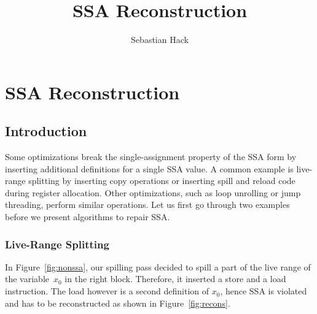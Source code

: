 





\title{SSA Reconstruction}
\author{Sebastian Hack}

\chapter{SSA Reconstruction }

\section{Introduction}

Some optimizations break the single-assignment property of the SSA form by inserting additional definitions for a single SSA value.
A common example is live-range splitting by inserting copy operations or inserting spill and reload code during register allocation.
Other optimizations, such as loop unrolling or jump threading, perform similar operations.
Let us first go through two examples before we present algorithms to repair SSA.

\subsection{Live-Range Splitting}

In Figure~\ref{fig:nonssa}, our spilling pass decided to spill a part of the live range of the variable~$x_0$ in the right block.
Therefore, it inserted a store and a load instruction. 
The load however is a second definition of $x_0$, hence SSA is violated and has to be reconstructed as shown in Figure~\ref{fig:recons}.

